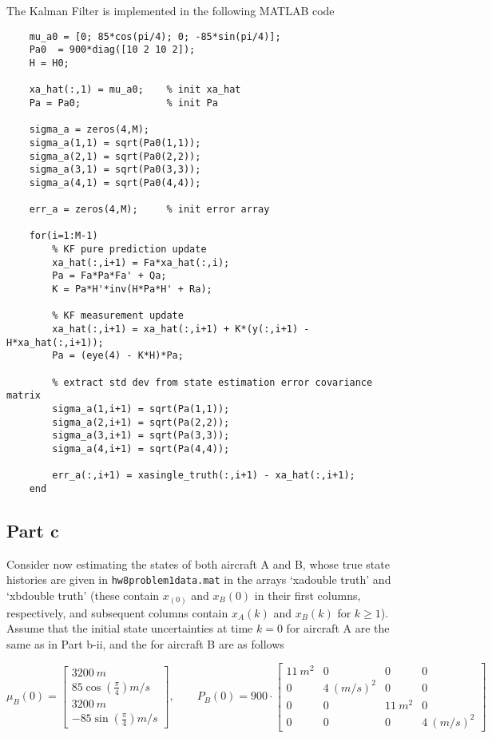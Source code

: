 \documentclass[]{article}
\begin{document}
\noindent The Kalman Filter is implemented in the following MATLAB code

\begin{lstlisting}
	mu_a0 = [0; 85*cos(pi/4); 0; -85*sin(pi/4)];
	Pa0  = 900*diag([10 2 10 2]);
	H = H0;
	
	xa_hat(:,1) = mu_a0;    % init xa_hat
	Pa = Pa0;               % init Pa
	
	sigma_a = zeros(4,M);
	sigma_a(1,1) = sqrt(Pa0(1,1));
	sigma_a(2,1) = sqrt(Pa0(2,2));
	sigma_a(3,1) = sqrt(Pa0(3,3));
	sigma_a(4,1) = sqrt(Pa0(4,4));
	
	err_a = zeros(4,M);		% init error array
	
	for(i=1:M-1)
		% KF pure prediction update
		xa_hat(:,i+1) = Fa*xa_hat(:,i);
		Pa = Fa*Pa*Fa' + Qa;
		K = Pa*H'*inv(H*Pa*H' + Ra);
	
		% KF measurement update
		xa_hat(:,i+1) = xa_hat(:,i+1) + K*(y(:,i+1) - H*xa_hat(:,i+1));
		Pa = (eye(4) - K*H)*Pa;
	
		% extract std dev from state estimation error covariance matrix
		sigma_a(1,i+1) = sqrt(Pa(1,1));
		sigma_a(2,i+1) = sqrt(Pa(2,2));
		sigma_a(3,i+1) = sqrt(Pa(3,3));
		sigma_a(4,i+1) = sqrt(Pa(4,4));
	
		err_a(:,i+1) = xasingle_truth(:,i+1) - xa_hat(:,i+1);
	end
\end{lstlisting}

\subsection*{Part c}

Consider now estimating the states of both aircraft A and B, whose true state histories are given in \texttt{hw8problem1data.mat} in the arrays ‘xadouble truth’ and ‘xbdouble truth’ (these contain $x_(0)$ and $x_B(0)$ in their first columns, respectively, and subsequent columns contain $x_A(k)$ and $x_B(k)$ for $k\geq1$). Assume that the initial state uncertainties at time $k=0$ for aircraft A are the same as in Part b-ii, and the for aircraft B are as follows

$$
\mu_B\left(0\right)=\left[
\begin{array}{c} 3200\:m\\ 85\cos\left(\frac{\pi}{4}\right) m/s\\ 3200\:m\\ -85\sin\left(\frac{\pi}{4}\right) m/s
\end{array}\right],\qquad
P_B\left(0\right)=900\cdot\left[
\begin{array}{cccc}
11\:m^2 & 0          & 0       & 0\\
0       & 4\:(m/s)^2 & 0       & 0\\
0       & 0          & 11\:m^2 & 0\\
0       & 0          & 0       & 4\:(m/s)^2
\end{array}
\right]
$$
\end{document}
